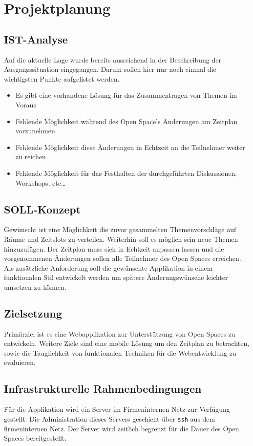 \section{Projektplanung}
\subsection{IST-Analyse}
Auf die aktuelle Lage wurde bereits ausreichend in der Beschreibung der Ausgangssituation eingegangen. Darum sollen hier nur noch einmal die wichtigsten Punkte aufgelistet werden.
\begin{itemize}
\item Es gibt eine vorhandene Lösung für das Zusammentragen von Themen im Voraus
\item Fehlende Möglichkeit während des Open Space's Änderungen am Zeitplan vorzunehmen
\item Fehlende Möglichkeit diese Änderungen in Echtzeit an die Teilnehmer weiter zu reichen
\item Fehlende Möglichkeit für das Festhalten der durchgeführten Diskussionen, Workshops, etc\ldots
\end{itemize}
\subsection{SOLL-Konzept}
Gewünscht ist eine Möglichkeit die zuvor gesammelten Themenvorschläge auf Räume und Zeitslots zu verteilen. Weiterhin soll es möglich sein neue Themen hinzuzufügen. Der Zeitplan muss sich in Echtzeit anpassen lassen und die vorgenommenen Änderungen sollen alle Teilnehmer des Open Spaces erreichen. Als zusätzliche Anforderung soll die gewünschte Applikation in einem funktionalen Stil entwickelt werden um spätere Änderungswünsche leichter umsetzen zu können.
\subsection{Zielsetzung}
Primärziel ist es eine Webapplikation zur Unterstützung von Open Spaces zu entwickeln. Weitere Ziele sind eine mobile Lösung um den Zeitplan zu betrachten, sowie die Tauglichkeit von funktionalen Techniken für die Webentwicklung zu evaluieren.
\subsection{Infrastrukturelle Rahmenbedingungen}
Für die Applikation wird ein Server im Firmeninternen Netz zur Verfügung gestellt. Die Administration dieses Servers geschieht über \texttt{ssh} aus dem firmeninternen Netz. Der Server wird zeitlich begrenzt für die Dauer des Open Spaces bereitgestellt.
